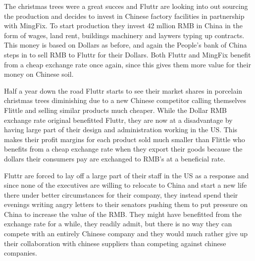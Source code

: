 The christmas trees were a great succes and Fluttr are looking into out 
sourcing the production and decides to invest in Chinese factory 
facilities in partnership with MingFix. To start production they invest 
42 mllion RMB in China in the form of wages, land rent, buildings 
machinery and laywers typing up contracts.  This money is based on 
Dollars as before, and again the People's bank of China steps in to sell 
RMB to Fluttr for their Dollars.  Both Fluttr and MingFix benefit from a 
cheap exchange rate once again, since this gives them more value for 
their money on Chinese soil.

Half a year down the road Fluttr starts to see their market shares in 
porcelain christmas trees diminishing due to a new Chinese competitor 
calling themselves Flittle and selling similar products much 
cheaper.  While the Dollar RMB exchange rate original benefitted Fluttr, 
they are now at a disadvantage by having large part of their design and 
administration working in the US. This makes their profit margins for 
each product sold much smaller than Flittle who benefits from a cheap 
exchange rate when they export their goods because the dollars their 
consumers pay are exchanged to RMB's at a beneficial rate.

Fluttr are forced to lay off a large part of their staff in the US as a 
response and since none of the executives are willing to relocate to 
China and start a new life there under better circumstances for their 
company, they instead spend their evenings writing angry letters to 
their senators pushing them to put pressure on China to increase the 
value of the RMB. They might have benefitted from the exchange rate for 
a while, they readily admit, but there is no way they can compete with 
an entirely Chinese company and they would much rather give up their 
collaboration with chinese suppliers than competing against chinese 
companies.




